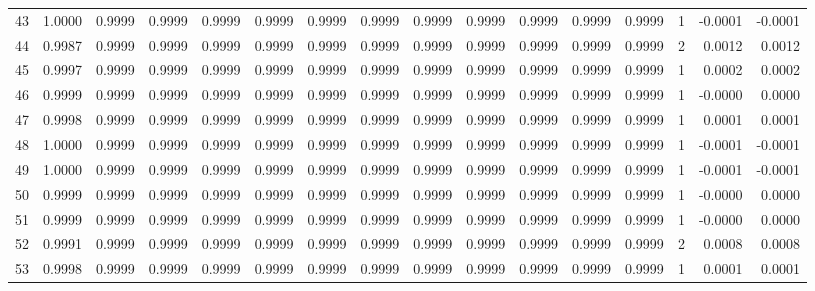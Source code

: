 \begin{tabular}{lrrrrrrrrrrrrrrr}
43  &      1.0000 &  0.9999 &  0.9999 &  0.9999 &  0.9999 &  0.9999 &  0.9999 &  0.9999 &  0.9999 &  0.9999 &   0.9999 &     0.9999 &      1 &                   -0.0001 &                    -0.0001 \\
44  &      0.9987 &  0.9999 &  0.9999 &  0.9999 &  0.9999 &  0.9999 &  0.9999 &  0.9999 &  0.9999 &  0.9999 &   0.9999 &     0.9999 &      2 &                    0.0012 &                     0.0012 \\
45  &      0.9997 &  0.9999 &  0.9999 &  0.9999 &  0.9999 &  0.9999 &  0.9999 &  0.9999 &  0.9999 &  0.9999 &   0.9999 &     0.9999 &      1 &                    0.0002 &                     0.0002 \\
46  &      0.9999 &  0.9999 &  0.9999 &  0.9999 &  0.9999 &  0.9999 &  0.9999 &  0.9999 &  0.9999 &  0.9999 &   0.9999 &     0.9999 &      1 &                   -0.0000 &                     0.0000 \\
47  &      0.9998 &  0.9999 &  0.9999 &  0.9999 &  0.9999 &  0.9999 &  0.9999 &  0.9999 &  0.9999 &  0.9999 &   0.9999 &     0.9999 &      1 &                    0.0001 &                     0.0001 \\
48  &      1.0000 &  0.9999 &  0.9999 &  0.9999 &  0.9999 &  0.9999 &  0.9999 &  0.9999 &  0.9999 &  0.9999 &   0.9999 &     0.9999 &      1 &                   -0.0001 &                    -0.0001 \\
49  &      1.0000 &  0.9999 &  0.9999 &  0.9999 &  0.9999 &  0.9999 &  0.9999 &  0.9999 &  0.9999 &  0.9999 &   0.9999 &     0.9999 &      1 &                   -0.0001 &                    -0.0001 \\
50  &      0.9999 &  0.9999 &  0.9999 &  0.9999 &  0.9999 &  0.9999 &  0.9999 &  0.9999 &  0.9999 &  0.9999 &   0.9999 &     0.9999 &      1 &                   -0.0000 &                     0.0000 \\
51  &      0.9999 &  0.9999 &  0.9999 &  0.9999 &  0.9999 &  0.9999 &  0.9999 &  0.9999 &  0.9999 &  0.9999 &   0.9999 &     0.9999 &      1 &                   -0.0000 &                     0.0000 \\
52  &      0.9991 &  0.9999 &  0.9999 &  0.9999 &  0.9999 &  0.9999 &  0.9999 &  0.9999 &  0.9999 &  0.9999 &   0.9999 &     0.9999 &      2 &                    0.0008 &                     0.0008 \\
53  &      0.9998 &  0.9999 &  0.9999 &  0.9999 &  0.9999 &  0.9999 &  0.9999 &  0.9999 &  0.9999 &  0.9999 &   0.9999 &     0.9999 &      1 &                    0.0001 &                     0.0001 \\

\end{tabular}
